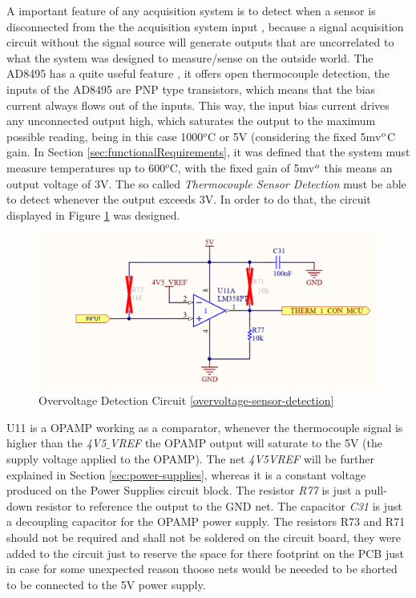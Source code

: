 	A important feature of any acquisition system is to detect when a sensor is disconnected from the the acquisition system input \cite{o2011pressure}, because a signal acquisition circuit without the signal source will generate outputs that are uncorrelated to what the system was designed to measure/sense on the outside world. The AD8495 has a quite useful feature \cite{ad8495-datasheet}, it offers open thermocouple detection, the inputs of the AD8495 are PNP type transistors, which means that the bias current always flows out of the inputs. This way, the input bias current drives any unconnected output high, which saturates the output to the maximum possible reading, being in this case 1000$^{o}$C or 5V (considering the fixed 5mv$\/ ^{o}$C gain. In Section \ref{sec:functionalRequirements}, it was defined that the system must measure temperatures up to 600$^{o}$C, with the fixed gain of 5mv$\/^{o}$ this means an output voltage of 3V. The so called \textit{Thermocouple Sensor Detection} must be able to detect whenever the output exceeds 3V. In order to do that, the circuit displayed in Figure \ref{fig:overvoltage-sensor-detection} was designed.
	
		\begin{figure}[htbp]
			\centering
				\includegraphics[scale=1]{figuras/fig-overvoltage-sensor-detection}
			\caption{Overvoltage Detection Circuit \ref{overvoltage-sensor-detection}}
			\label{fig:overvoltage-sensor-detection}
		\end{figure}
		
	U11 is a OPAMP working as a comparator, whenever the thermocouple signal is higher than the \textit{4V5$\_$VREF} the OPAMP output will saturate to the 5V (the supply voltage applied to the OPAMP). The net \textit{4V5\textunderscore VREF} will be further explained in Section \ref{sec:power-supplies}, whereas it is a constant voltage produced on the Power Supplies circuit block. The resistor \textit{R77} is just a pull-down resistor to reference the output to the GND net. The capacitor \textit{C31} is just a decoupling capacitor for the OPAMP power supply. The resistors R73 and R71 should not be required and shall not be soldered on the circuit board, they were added to the circuit just to reserve the space for there footprint on the PCB just in case for some unexpected reason thoose nets would be neeeded to be shorted to be connected to the 5V power supply.

